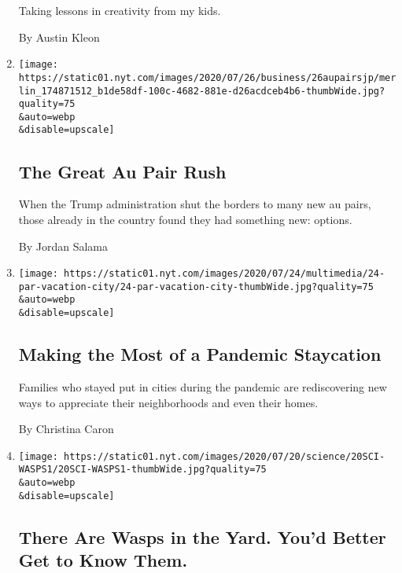 \begin{enumerate}
  Taking lessons in creativity from my kids.

  By Austin Kleon
\item
  \href{/2020/07/25/business/the-great-au-pair-rush.html}{}

  \texttt{[image: https://static01.nyt.com/images/2020/07/26/business/26aupairsjp/merlin\_174871512\_b1de58df-100c-4682-881e-d26acdceb4b6-thumbWide.jpg?quality=75\\\&auto=webp\\\&disable=upscale]}

  \hypertarget{the-great-au-pair-rush}{%
  \subsection{The Great Au Pair Rush}\label{the-great-au-pair-rush}}

  When the Trump administration shut the borders to many new au pairs,
  those already in the country found they had something new: options.

  By Jordan Salama
\item
  \href{/2020/07/24/parenting/summer-staycation-coronavirus.html}{}

  \texttt{[image: https://static01.nyt.com/images/2020/07/24/multimedia/24-par-vacation-city/24-par-vacation-city-thumbWide.jpg?quality=75\\\&auto=webp\\\&disable=upscale]}

  \hypertarget{making-the-most-of-a-pandemic-staycation}{%
  \subsection{Making the Most of a Pandemic
  Staycation}\label{making-the-most-of-a-pandemic-staycation}}

  Families who stayed put in cities during the pandemic are
  rediscovering new ways to appreciate their neighborhoods and even
  their homes.

  By Christina Caron
\item
  \href{/article/paper-wasps-yellowjackets.html}{}

  \texttt{[image: https://static01.nyt.com/images/2020/07/20/science/20SCI-WASPS1/20SCI-WASPS1-thumbWide.jpg?quality=75\\\&auto=webp\\\&disable=upscale]}

  \hypertarget{there-are-wasps-in-the-yard-youd-better-get-to-know-them}{%
  \subsection{There Are Wasps in the Yard. You'd Better Get to Know
  Them.}\label{there-are-wasps-in-the-yard-youd-better-get-to-know-them}}


\end{enumerate}
